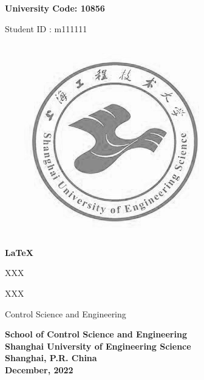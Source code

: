 

\newpage

    {\noindent \songti\sihao\bfseries
            \hspace{18em} University Code: 10856
    
            \hspace{17em} Student \quad ID : m111111
    }
    
    \begin{center}
            \includegraphics[scale=0.4]{images/logo}
    \end{center}
    
    \begin{center}\songti\yihao\bfseries
            \LaTeX
    \end{center}
    
    \vspace{4cm}
    \begin{description}[
                    labelindent=4.5cm,
                    topsep=1cm,
                    format=\sanhao
            ]\songti\sanhao
            \item[Candidate:] XXX
            \item[Supervisor:] XXX
            \item[\qquad Major:] Control Science and Engineering
    \end{description}
    
    \vspace{1cm}
    \begin{center}\sanhao\textbf{
        School of Control Science and Engineering \\
        Shanghai University of Engineering Science \\
        Shanghai, P.R. China \\
        December, 2022
    }
    \end{center}
